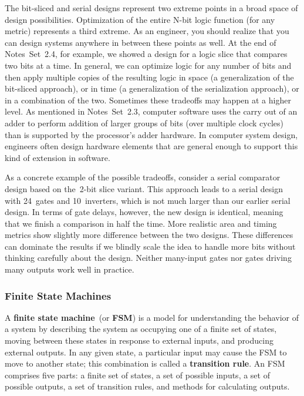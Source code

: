 The bit-sliced and serial designs represent two extreme points in 
a broad space of design possibilities.  Optimization of the entire
N-bit logic function (for any metric) represents a third extreme.
As an engineer, you should realize that you can design systems
anywhere in between these points as well.  At the end of Notes~Set~2.4,
for example, we showed a design for a logic slice that compares 
two bits at a time.  In general, we can optimize logic for any 
number of bits and then apply multiple copies of the resulting
logic in space (a generalization of the bit-sliced approach),
or in time (a generalization of the serialization approach),
or in a combination of the two.
%
Sometimes these tradeoffs may happen at a higher level.
As mentioned in Notes~Set~2.3, computer software uses 
the carry out of an adder to perform addition of larger 
groups of bits (over multiple clock cycles)
than is supported by the processor's adder hardware.
%
In computer system design, engineers often design hardware elements
that are general enough to support this kind of extension in software.

As a concrete example of the possible tradeoffs,
consider a serial comparator design based on the~\mbox{2-bit} slice variant.
%
This approach leads to a serial design with 24~gates and 10~inverters, 
which is not much
larger than our earlier serial design.  In terms of gate delays,
however, the new design is identical, meaning that we finish a comparison
in half the time.  More realistic area and timing metrics show
slightly more difference between the two designs.  These differences can 
dominate the 
results if we blindly scale the idea to handle more bits without 
thinking carefully about the design.  Neither many-input gates
nor gates driving many outputs work well in practice.

\pagebreak

\subsubsection{Finite State Machines}

A {\bf finite state machine}~(or {\bf FSM}) is a model for understanding
the behavior of a system by describing the system as occupying one of a
finite set of states, moving between these states in response to
external inputs, and producing external outputs.  In any given state,
a particular input may cause the FSM to move to another state; this 
combination is called a {\bf transition rule}.
%
An FSM comprises five parts: a finite set of states, a set of 
possible inputs, a set of possible outputs, a set of transition rules,
and methods for calculating outputs.  


